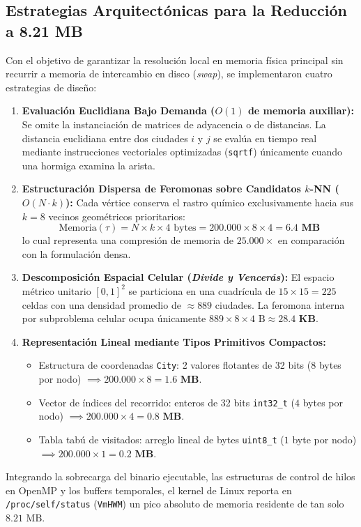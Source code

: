 \documentclass[11pt,a4paper]{article}
\begin{document}
\subsection{Estrategias Arquitectónicas para la Reducción a 8.21 MB}
Con el objetivo de garantizar la resolución local en memoria física principal sin recurrir a memoria de intercambio en disco (\emph{swap}), se implementaron cuatro estrategias de diseño:
\begin{enumerate}
    \item \textbf{Evaluación Euclidiana Bajo Demanda ($O(1)$ de memoria auxiliar):} Se omite la instanciación de matrices de adyacencia o de distancias. La distancia euclidiana entre dos ciudades $i$ y $j$ se evalúa en tiempo real mediante instrucciones vectoriales optimizadas (\texttt{sqrtf}) únicamente cuando una hormiga examina la arista.
    \item \textbf{Estructuración Dispersa de Feromonas sobre Candidatos $k$-NN ($O(N \cdot k)$):} Cada vértice conserva el rastro químico exclusivamente hacia sus $k=8$ vecinos geométricos prioritarios:
    \begin{equation}
        \text{Memoria}(\tau) = N \times k \times 4\text{ bytes} = 200.000 \times 8 \times 4 = \mathbf{6.4\text{ MB}}
    \end{equation}
    lo cual representa una compresión de memoria de $\mathbf{25.000\times}$ en comparación con la formulación densa.
    \item \textbf{Descomposición Espacial Celular (\emph{Divide y Vencerás}):} El espacio métrico unitario $[0, 1]^2$ se particiona en una cuadrícula de $15 \times 15 = 225$ celdas con una densidad promedio de $\approx 889$ ciudades. La feromona interna por subproblema celular ocupa únicamente $889 \times 8 \times 4\text{ B} \approx \mathbf{28.4\text{ KB}}$.
    \item \textbf{Representación Lineal mediante Tipos Primitivos Compactos:}
    \begin{itemize}
        \item Estructura de coordenadas \texttt{City}: 2 valores flotantes de 32 bits ($8$ bytes por nodo) $\implies 200.000 \times 8 = \mathbf{1.6\text{ MB}}$.
        \item Vector de índices del recorrido: enteros de 32 bits \texttt{int32\_t} ($4$ bytes por nodo) $\implies 200.000 \times 4 = \mathbf{0.8\text{ MB}}$.
        \item Tabla tabú de visitados: arreglo lineal de bytes \texttt{uint8\_t} ($1$ byte por nodo) $\implies 200.000 \times 1 = \mathbf{0.2\text{ MB}}$.
    \end{itemize}
\end{enumerate}
Integrando la sobrecarga del binario ejecutable, las estructuras de control de hilos en OpenMP y los buffers temporales, el kernel de Linux reporta en \texttt{/proc/self/status} (\texttt{VmHWM}) un pico absoluto de memoria residente de tan solo \textbf{$8.21\text{ MB}$}.
\end{document}
